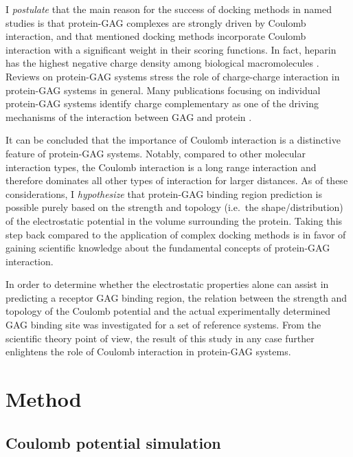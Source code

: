 I \textit{postulate} that the main reason for the success of docking methods in
named studies is that protein-GAG complexes are strongly driven by Coulomb
interaction, and that mentioned docking methods incorporate Coulomb interaction
with a significant weight in their scoring functions. In fact, heparin has the
highest negative charge density among biological macromolecules
\cite{capila_linhardt_hep_prot_2002}. Reviews on protein-GAG systems
\cite{essentials_glycobiology_gags_2009,gandhi_structure_2008} stress
the role of charge-charge interaction in protein-GAG systems in general. Many
publications focusing on individual protein-GAG systems identify charge
complementary as one of the driving mechanisms of the interaction between GAG
and protein
\cite{gandhi_bmp_heparin_binding_sites_2012,faham_heparin_1996,%
pichert_characterization_2012,rogers_gag_prot_prot_2011}.

It can be concluded that the importance of Coulomb interaction is a distinctive
feature of protein-GAG systems. Notably, compared to other molecular interaction
types, the Coulomb interaction is a long range interaction and therefore
dominates all other types of interaction for larger distances. As of these
considerations, I \textit{hypothesize} that protein-GAG binding region
prediction is possible purely based on the strength and topology (i.e.\ the
shape/distribution) of the electrostatic potential in the volume surrounding the
protein. Taking this step back compared to the application of complex docking
methods is in favor of gaining scientific knowledge about the fundamental
concepts of protein-GAG interaction.

In order to determine whether the electrostatic properties alone can assist in
predicting a receptor GAG binding region, the relation between the strength and
topology of the Coulomb potential and the actual experimentally determined GAG
binding site was investigated for a set of reference systems. From the
scientific theory point of view, the result of this study in any case further
enlightens the role of Coulomb interaction in protein-GAG systems.


\section{Method}

\subsection{Coulomb potential simulation}

